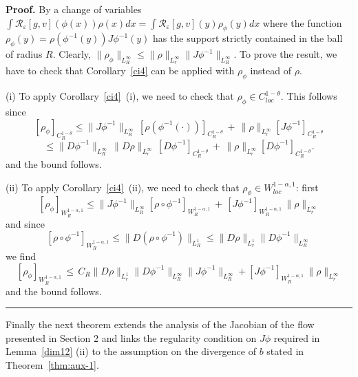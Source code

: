 \documentclass{article}
\newenvironment{proof}[1][Proof]{\noindent\textbf{#1.} }{\ \rule{0.5em}{0.5em}}
\begin{document}
\begin{proof}
 By a change of variables $ \int\mathcal{R}_{\varepsilon}[
g,v] (  \phi(  x) )  \rho( x) dx=\int\mathcal{R}_{\varepsilon}[ g,v]
(  y)  \rho_{\phi}(  y) dx $ where the function
 $ \rho_{\phi}(  y)  =\rho(  \phi^{-1}( y) )
 J\phi^{-1}(  y)
 $
 has the support strictly contained in the ball
of radius $R$. Clearly, $
 \|  \rho_{\phi}\| _{L_{R}^{\infty}}\leq \| \rho\|
_{L_{r}^{\infty}}\| J\phi^{-1}\| _{L_{R}^{\infty}}. $ To prove the
result, we  have to check that Corollary~\ref{ci4} can be applied
with $\rho_{\phi}$ instead of $\rho$.

(i) To apply Corollary~\ref{ci4}~(i), we need to check that
 $ \rho_{\phi} \in C^{1 -\theta}_{loc}$. This follows since
$$
[\rho_{\phi} ]_{ C^{1 -\theta}_{R}} \le
 \| J\phi^{-1}\|
_{L_{R}^{\infty}} \, [\rho ({\phi}^{-1} (\cdot) ) ]_{ C^{1
-\theta}_{R}} \, + \, \| \rho \|_{L_{r}^{\infty}}
 [J\phi^{-1}]_{C^{1 -\theta}_{R}}
$$
$$
\le  \| D\phi^{-1}\| _{L_{R}^{\infty}} \,  \| D\rho\|
_{L_{r}^{\infty}} \, [ D\phi^{-1}]_{C^{1 -\theta}_{R}}
 \, + \, \| \rho \|_{L_{r}^{\infty}}
 [D\phi^{-1}]_{C^{1 -\theta}_{R}}.
$$
and the bound follows.

\medskip (ii) To apply Corollary~\ref{ci4}~(ii), we
  need to check that
 $ \rho_{\phi} \in W^{1- \alpha,1}_{loc}$: first
$$ [\rho_{\phi} ]_{W^{1 - \alpha, 1}_R }
\le  \| J\phi^{-1}\| _{L_{R}^{\infty}} [\rho \circ \phi^{-1}]_{W^{1-
\alpha,1}_R}
 \, + \,
 [J \phi^{-1} ]_{W^{1- \alpha,1}_R} \, \| \rho\|
_{L_{r}^{\infty}}
$$
and since
$$
[\rho \circ \phi^{-1}]_{W^{1- \alpha,1}_R} \le \|D (\rho \circ
\phi^{-1})\|_{L^1_R} \le \|D\rho\|_{L^1_r} \|D
\phi^{-1}\|_{L^\infty_R}
$$
we find
$$
[\rho_{\phi} ]_{W^{1 - \alpha, 1}_R } \, \le \,  C_R
\|D\rho\|_{L^1_r} \|D \phi^{-1}\|_{L^\infty_R} \| J\phi^{-1}\|
_{L_{R}^{\infty}} + [J \phi^{-1} ]_{W^{1- \alpha,1}_R} \, \| \rho\|
_{L_{r}^{\infty}}
$$
and the bound follows.
\end{proof}

Finally the next theorem extends the analysis of the Jacobian of the
flow presented in Section 2 and links the regularity condition on
$J\phi$ required in  Lemma~\ref{dim12} (ii) to the assumption on the
divergence of $b$ stated in Theorem~\ref{thm:aux-1}.
\end{document}

